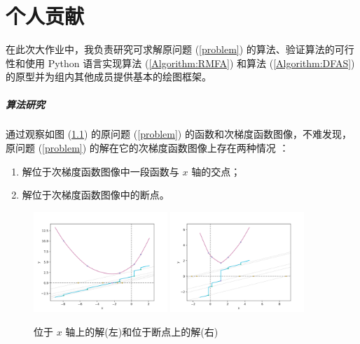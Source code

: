 
\chapter{个人贡献}

在此次大作业中，我负责研究可求解原问题 (\ref{problem}) 的算法、验证算法的可行性和使用 Python 语言实现算法 (\ref{Algorithm:RMFA}) 和算法 (\ref{Algorithm:DFAS}) 的原型并为组内其他成员提供基本的绘图框架。

\paragraph{算法研究}

通过观察如图 (\ref{Figure}) 的原问题 (\ref{problem}) 的函数和次梯度函数图像，不难发现，原问题 (\ref{problem}) 的解在它的次梯度函数图像上存在两种情况 \cite{10.1016/j.patcog.2017.02.006}：

\begin{enumerate}
    \item 解位于次梯度函数图像中一段函数与 $x$ 轴的交点；
    \item 解位于次梯度函数图像中的断点。
\end{enumerate}

\begin{figure}[htb]
    \centering
    \includegraphics[width=0.45\textwidth]{figures/AxisX.png}
    \qquad
    \includegraphics[width=0.45\textwidth]{figures/Breakpoint.png}
    \caption{位于 $x$ 轴上的解(左)和位于断点上的解(右)}
    \label{Figure}
\end{figure}

